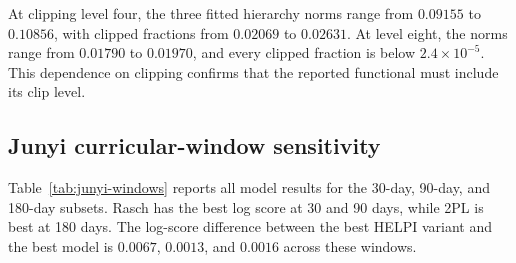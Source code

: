 \documentclass[
  12pt]{article}
\theoremstyle{definition}
\theoremstyle{plain}
\begin{document}
At clipping level four, the three fitted hierarchy norms range from $0.09155$ to $0.10856$, with clipped fractions from $0.02069$ to $0.02631$. At level eight, the norms range from $0.01790$ to $0.01970$, and every clipped fraction is below $2.4\times10^{-5}$. This dependence on clipping confirms that the reported functional must include its clip level.

\subsection{Junyi curricular-window sensitivity}

Table~\ref{tab:junyi-windows} reports all model results for the 30-day, 90-day, and 180-day subsets. Rasch has the best log score at 30 and 90 days, while 2PL is best at 180 days. The log-score difference between the best HELPI variant and the best model is $0.0067$, $0.0013$, and $0.0016$ across these windows.
\end{document}
